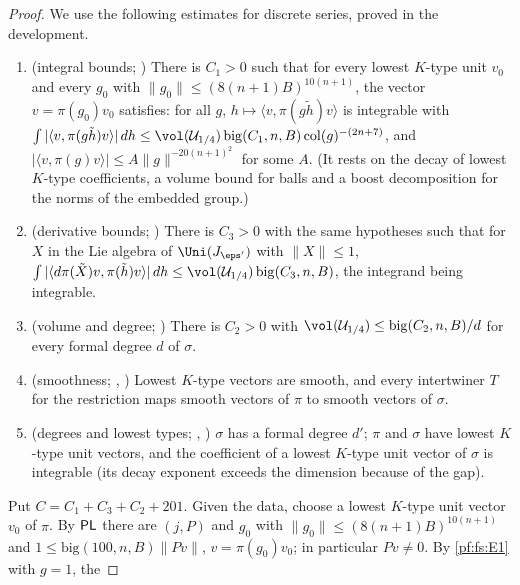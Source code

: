 \begin{proof}
We use the following estimates for discrete series, proved in the development.
\begin{enumerate}[label=(E\arabic*)]
\item\label{pf:fs:E1} (integral bounds; ) There is $C_1>0$
such that for every lowest $K$-type unit $v_0$ and every $g_0$ with $\|g_0\|\le(8(n+1)B)^{10(n+1)}$, the vector $v=\pi(g_0)v_0$ satisfies:
for all $g$, $h\mapsto\langle v,\pi(g\tilde h)v\rangle$ is integrable with
$\int|\langle v,\pi(g\tilde h)v\rangle|\,dh\le\vol(\mathcal U_{1/4})\,\mathrm{big}(C_1,n,B)\,\mathrm{col}(g)^{-(2n+7)}$, and
$|\langle v,\pi(g)v\rangle|\le A\|g\|^{-20(n+1)^2}$ for some $A$. (It rests on the decay of lowest $K$-type coefficients, a volume bound for
balls and a boost decomposition for the norms of the embedded group.)
\item\label{pf:fs:E2} (derivative bounds; ) There is $C_3>0$
with the same hypotheses such that for $X$ in the Lie algebra of $\Uni(J_{\eps'})$ with $\|X\|\le1$,
$\int|\langle d\pi(\tilde X)v,\pi(\tilde h)v\rangle|\,dh\le\vol(\mathcal U_{1/4})\,\mathrm{big}(C_3,n,B)$, the integrand being integrable.
\item\label{pf:fs:E3} (volume and degree; ) There is $C_2>0$ with
$\vol(\mathcal U_{1/4})\le\mathrm{big}(C_2,n,B)/d$ for every formal degree $d$ of $\sigma$.
\item\label{pf:fs:E4} (smoothness; , )
Lowest $K$-type vectors are smooth, and every intertwiner $T$ for the restriction maps smooth vectors of $\pi$ to smooth vectors of $\sigma$.
\item\label{pf:fs:E5} (degrees and lowest types; ,
) $\sigma$ has a formal degree $d'$; $\pi$ and $\sigma$ have
lowest $K$-type unit vectors, and the coefficient of a lowest $K$-type unit vector of $\sigma$ is integrable (its decay exponent exceeds the
dimension because of the gap).
\end{enumerate}
Put $C=C_1+C_3+C_2+201$. Given the data, choose a lowest $K$-type unit vector $v_0$ of $\pi$. By $\mathsf{PL}$ there are $(j,P)$ and $g_0$ with
$\|g_0\|\le(8(n+1)B)^{10(n+1)}$ and $1\le\mathrm{big}(100,n,B)\|Pv\|$, $v=\pi(g_0)v_0$; in particular $Pv\ne0$. By \ref{pf:fs:E1} with $g=1$, the

\end{proof}
